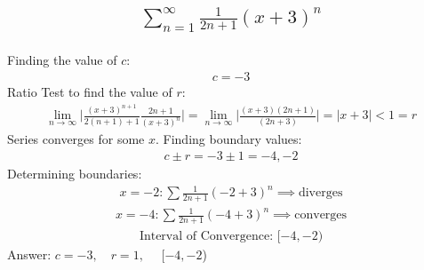 \documentclass{article}
\begin{document}
\subsection{
	\begin{align*}
		\sum_{n = 1}^\infty \frac{1}{2n + 1} (x + 3)^n
	\end{align*}
}
Finding the value of $c$:
\begin{align*}
	c = -3
\end{align*}
Ratio Test to find the value of $r$:
\begin{align*}
	\lim_{n \to \infty} \bigg| \frac{(x + 3)^{n + 1}}{2(n + 1) + 1} \frac{2n + 1}{(x + 3)^n} \bigg| = \lim_{n \to \infty} \bigg| \frac{(x + 3)(2n + 1)}{(2n + 3)} \bigg| = | x + 3 | < 1 = r
\end{align*}
Series converges for some $x$. Finding boundary values:
\begin{align*}
	c \pm r = -3 \pm 1 = -4, -2
\end{align*}
Determining boundaries:
\begin{align*}
	x = -2: \sum \frac{1}{2n + 1} (-2 + 3)^n \implies \text{diverges}
\end{align*}
\begin{align*}
	x = -4: \sum \frac{1}{2n + 1} (-4 + 3)^n \implies \text{converges}
\end{align*}
\begin{align*}
	\text{Interval of Convergence: } [-4, -2)
\end{align*}
Answer: $c = -3, \quad r = 1, \quad $ [$-4, -2$)

\end{document}
